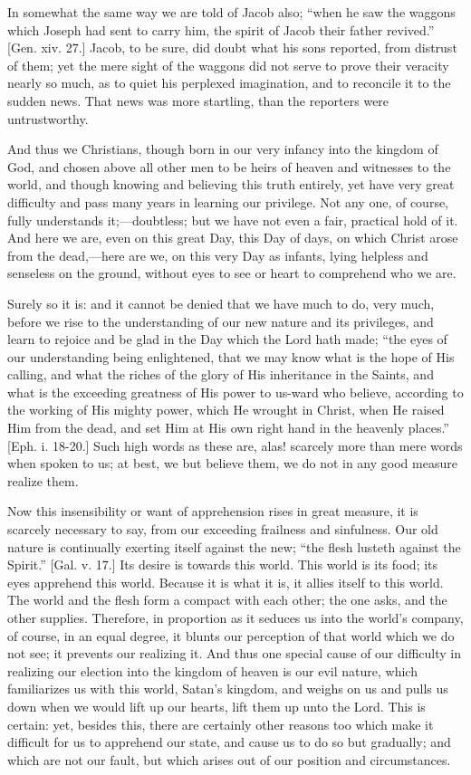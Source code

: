 In somewhat the same way we are told of Jacob also; ``when he saw
the waggons which Joseph had sent to carry him, the spirit of Jacob
their father revived.'' [Gen. xiv. 27.] Jacob, to be sure, did doubt
what his sons reported, from distrust of them; yet the mere sight of the
waggons did not serve to prove their veracity nearly so much, as to
quiet his perplexed imagination, and to reconcile it to the sudden news.
That news was more startling, than the reporters were untrustworthy.

And thus we Christians, though born in our very infancy into the
kingdom of God, and chosen above all other men to be heirs of heaven and
witnesses to the world, and though knowing and believing this truth
entirely, yet have very great difficulty and pass many years in learning
our privilege. Not any one, of course, fully understands it;—doubtless;
but we have not even a fair, practical hold of it. And here we are, even
on this great Day, this Day of days, on which Christ arose from the
dead,—here are we, on this very Day as infants, lying helpless and
senseless on the ground, without eyes to see or heart to comprehend who
we are.

Surely so it is: and it cannot be denied that we have much to do,
very much, before we rise to the understanding of our new nature and its
privileges, and learn to rejoice and be glad in the Day which the Lord
hath made; ``the eyes of our understanding being enlightened, that
we may know what is the hope of His calling, and what the riches of the
glory of His inheritance in the Saints, and what is the exceeding
greatness of His power to us-ward who believe, according to the working
of His mighty power, which He wrought in Christ, when He raised Him from
the dead, and set Him at His own right hand in the heavenly
places.'' [Eph. i. 18-20.] Such high words as these are, alas!
scarcely more than mere words when spoken to us; at best, we but believe
them, we do not in any good measure realize them.

Now this insensibility or want of apprehension rises in great
measure, it is scarcely necessary to say, from our exceeding frailness
and sinfulness. Our old nature is continually exerting itself against
the new; ``the flesh lusteth against the Spirit.'' [Gal. v. 17.]
Its desire is towards this world. This world is its food; its eyes
apprehend this world. Because it is what it is, it allies itself to this
world. The world and the flesh form a compact with each other; the one
asks, and the other supplies. Therefore, in proportion as it seduces us
into the world's company, of course, in an equal degree, it blunts our
perception of that world which we do not see; it prevents our realizing
it. And thus one special cause of our difficulty in realizing our
election into the kingdom of heaven is our evil nature, which
familiarizes us with this world, Satan's kingdom, and weighs on us and
pulls us down when we would lift up our hearts, lift them up unto the
Lord. This is certain: yet, besides this, there are certainly other
reasons too which make it difficult for us to apprehend our state, and
cause us to do so but gradually; and which are not our fault, but which
arises out of our position and circumstances.

